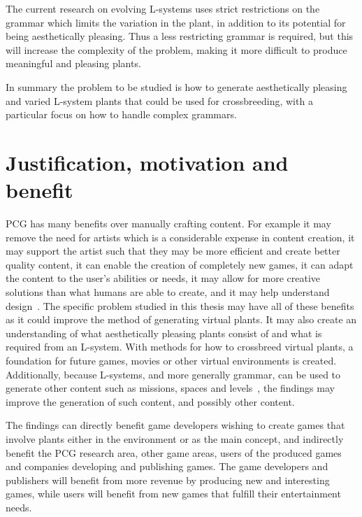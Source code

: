 The current research on evolving \glspl{L-system} uses strict restrictions on the grammar which limits the variation in the plant, in addition to its potential for being aesthetically pleasing. %
Thus a less restricting grammar is required, but this will increase the complexity of the problem, making it more difficult to produce meaningful and pleasing plants.

In summary the problem to be studied is how to generate aesthetically pleasing and varied \gls{L-system} plants that could be used for crossbreeding, with a particular focus on how to handle complex grammars.

\section{Justification, motivation and benefit}
\gls{PCG} has many benefits over manually crafting content.
For example it may remove the need for artists which is a considerable expense in content creation, it may support the artist such that they may be more efficient and create better quality content, it can enable the creation of completely new games, it can adapt the content to the user's abilities or needs, it may allow for more creative solutions than what humans are able to create, and it may help understand design~\cite{PCG_1}.
The specific problem studied in this thesis may have all of these benefits as it could improve the method of generating virtual plants.
It may also create an understanding of what aesthetically pleasing plants consist of and what is required from an \gls{L-system}.
With methods for how to crossbreed virtual plants, a foundation for future games, movies or other virtual environments is created.
Additionally, because \glspl{L-system}, and more generally grammar, can be used to generate other content such as missions, spaces and levels~\cite{PCG_5}, the findings may improve the generation of such content, and possibly other content.

The findings can directly benefit game developers wishing to create games that involve plants either in the environment or as the main concept, and indirectly benefit the \gls{PCG} research area, other game areas, users of the produced games and companies developing and publishing games.
The game developers and publishers will benefit from more revenue by producing new and interesting games, while users will benefit from new games that fulfill their entertainment needs.

